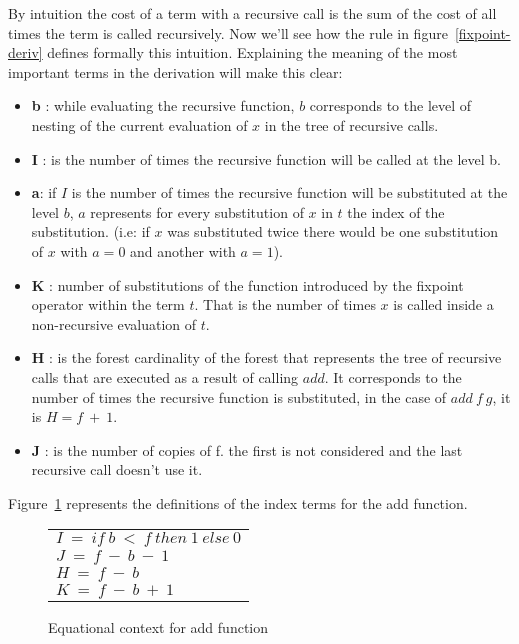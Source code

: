 \documentclass[a4paper,12pt]{article}
\begin{document}
By intuition the cost of a term with a recursive call is the sum of
the cost of all times the term is called recursively. Now we'll see
how the rule in figure~\ref{fixpoint-deriv} defines formally this
intuition. Explaining the meaning of the most important terms in the
derivation will make this clear:

\begin{itemize}


\item \textbf{b} : while evaluating the recursive function, $b$
  corresponds to the level of nesting of the current evaluation of $x$
 in the tree of recursive calls.
\item \textbf{I} : is the number of times the recursive function will be called at
the level b. 
\item \textbf{a}: if $I$ is the number of times the recursive function
  will be substituted at the level $b$, $a$ represents for every
  substitution of $x$ in $t$ the index of the substitution. (i.e: if
  $x$ was substituted twice there would be one substitution of $x$
  with $a=0$ and another with $a=1$).
\item \textbf{K} : number of substitutions of the function introduced
by the fixpoint operator 
within the term $t$. That is the number of times $x$ is called inside
a non-recursive evaluation of $t$.
\item \textbf{H} : is the forest cardinality of the forest that
  represents the tree of recursive calls that are executed as a result
  of calling $add$. It corresponds to the number of times the
  recursive function is substituted, in the case of $add~f~g$, it is
  $H=f~+~1$.


\item \textbf{J} : is the number of copies of f. the first is not considered and
the last recursive call doesn't use it.

\end{itemize}

Figure~\ref{definitionindexterms} represents the definitions of the index
terms for the add function.


\begin{figure}[ht]
\begin{center}
  \begin{tabular}{l}
    $I~=~if~b~<~f~then~1~else~0$ \\

    $J~=~f~-~b~-~1$ \\

    $H~=~f~-~b$ \\

    $K~=~f~-~b~+~1$ \\
  \end{tabular}
\end{center}
\caption{Equational context for add function}
\label{definitionindexterms}
\end{figure}
\end{document}
